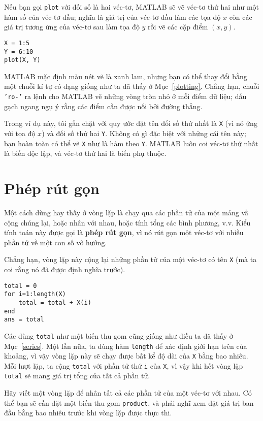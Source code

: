 \documentclass[12pt]{book}
\begin{document}
Nếu bạn gọi {\tt plot} với đối số là hai véc-tơ, MATLAB sẽ 
vẽ véc-tơ thứ hai như một hàm số của véc-tơ đầu; nghĩa là 
giá trị của véc-tơ đầu làm các tọa độ $x$ còn các giá trị tương ứng
của véc-tơ sau làm tọa độ $y$ rồi vẽ các cặp điểm $(x, y)$.

\begin{verbatim}
X = 1:5
Y = 6:10
plot(X, Y)
\end{verbatim}

MATLAB mặc định màu nét vẽ là xanh lam, nhưng bạn có thể thay đổi
bằng một chuỗi kí tự có dạng giống như ta đã thấy ở Mục~\ref{plotting}.
Chẳng hạn, chuỗi {\tt 'ro-'} ra lệnh cho MATLAB vẽ những vòng tròn nhỏ
ở mỗi điểm dữ liệu; dấu gạch ngang ngụ ý rằng các điểm cần được nối
bởi đường thẳng.

Trong ví dụ này, tôi gắn chặt với quy ước đặt tên đối số thứ nhất
là {\tt X} (vì nó ứng với tọa độ $x$) và đối số thứ hai {\tt Y}.
Không có gì đặc biệt với những cái tên này; bạn hoàn toàn
có thể vẽ {\tt X} như là hàm theo {\tt Y}. MATLAB luôn coi 
véc-tơ thứ nhất là biến độc lập, và véc-tơ thứ hai là biến phụ thuộc.



\section{Phép rút gọn}
\label{reduce}

Một cách dùng hay thấy ở vòng lặp là chạy qua các phần tử của một
mảng vầ cộng chúng lại, hoặc nhân với nhau, hoặc tính tổng các
bình phương, v.v. Kiểu tính toán này được gọi là {\bf phép rút gọn},
vì nó rút gọn một véc-tơ với nhiều phần tử về một con số vô hướng.

Chẳng hạn, vòng lặp này cộng lại những phần tử của một véc-tơ có tên
{\tt X} (mà ta coi rằng nó đã được định nghĩa trước).

\begin{verbatim}
total = 0
for i=1:length(X)
    total = total + X(i)
end
ans = total
\end{verbatim}

Các dùng {\tt total} như một biến thu gom cũng giống như điều ta đã
thấy ở Mục~\ref{series}.  Một lần nữa, ta dùng hàm {\tt length}
để xác định giới hạn trên của khoảng, vì vậy vòng lặp này sẽ chạy
được bất kể độ dài của {\tt X} bằng bao nhiêu. Mỗi lượt lặp, 
ta cộng {\tt total} với phần tử thứ {\tt i} của {\tt X}, 
vì vậy khi hết vòng lặp {\tt total} sẽ mang giá trị tổng của
tất cả phần tử.

\begin{ex}
Hãy viết một vòng lặp để nhân tất cả các phần tử của một véc-tơ
với nhau. Có thể bạn sẽ cần đặt một biến thu gom {\tt product}, 
và phải nghĩ xem đặt giá trị ban đầu bằng bao nhiêu trước khi
vòng lặp được thực thi.
\end{ex}
\end{document}
